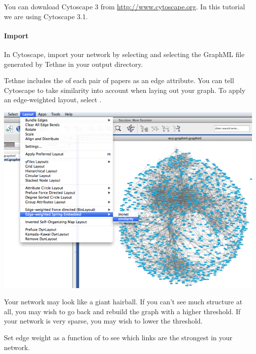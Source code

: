\documentclass[letterpaper,10pt,english]{sphinxmanual}
\begin{document}
You can download Cytoscape 3 from \href{http://www.cytoscape.org}{http://www.cytoscape.org}.
In this tutorial we are using Cytoscape 3.1.


\paragraph{Import}
\label{tutorial.bibliocoupling:import}
In Cytoscape, import your network by selecting 
and selecting the GraphML file generated by Tethne in your output directory.

Tethne includes the  of each pair of papers as an edge attribute. You can
tell Cytoscape to take similarity into account when laying out your graph. To apply an
edge-weighted layout, select .

{\hfill\includegraphics{cyto.1.png}\hfill}

Your network may look like a giant hairball. If you can't see much structure at all, you
may wish to go back and rebuild the graph with a higher threshold. If your network is very
sparse, you may wish to lower the threshold.

Set edge weight as a function of  to see which links are the strongest in
your network.
\end{document}
